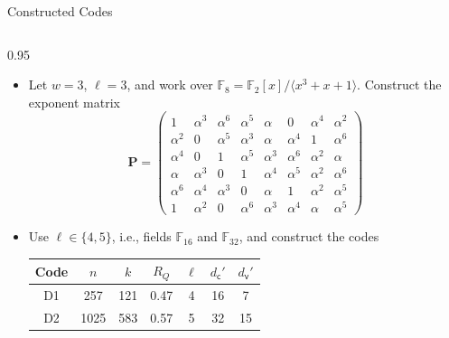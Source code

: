 \documentclass[10pt, aspectratio=169]{beamer}
\newcommand{\bP}{\mathbf{P}}
\begin{document}
\begin{frame}[c]{Constructed Codes}
  \begin{columns}[T,onlytextwidth]
    \begin{column}{0.95\textwidth}
      \begin{itemize}
        \item Let $w=3$, $\ell=3$, and work over
        \(
          \mathbb{F}_8=\mathbb{F}_2[x]/\langle x^3+x+1\rangle.
        \)
        Construct the exponent matrix
      \[
      \bP=
      \begin{pmatrix}
      1 & \alpha^3 & \alpha^6 & \alpha^5 & \alpha & 0 & \alpha^4 & \alpha^2 \\
      \alpha^2 & 0 & \alpha^5 & \alpha^3 & \alpha & \alpha^4 & 1 & \alpha^6 \\
      \alpha^4 & 0 & 1 & \alpha^5 & \alpha^3 & \alpha^6 & \alpha^2 & \alpha\\
      \hline
      \alpha & \alpha^3 & 0 & 1 & \alpha^4 & \alpha^5 & \alpha^2 & \alpha^6 \\
      \alpha^6 & \alpha^4 & \alpha^3 & 0 & \alpha & 1 & \alpha^2 & \alpha^5 \\
      1 & \alpha^2 & 0 & \alpha^6 & \alpha^3 & \alpha^4 & \alpha & \alpha^5
      \end{pmatrix}
      \]

    \item Use $\ell\in\{4,5\}$, i.e., fields $\mathbb{F}_{16}$ and $\mathbb{F}_{32}$, and construct the codes

        \vspace{0.2cm}
      \centering
      \small
      \begin{tabular}{ccccccc}
        \toprule
        Code & $n$ & $k$ & $R_Q$ & $\ell$ & $d_{\mathsf{c}}'$ & $d_{\mathsf{v}}'$\\
        \midrule
        D1 & 257 & 121 & 0.47 & 4 & 16 & 7\\
        D2 & 1025 & 583 & 0.57 & 5 & 32 & 15\\
        \bottomrule
      \end{tabular}
      \end{itemize}
    \end{column}
  \end{columns}
\end{frame}
\end{document}
